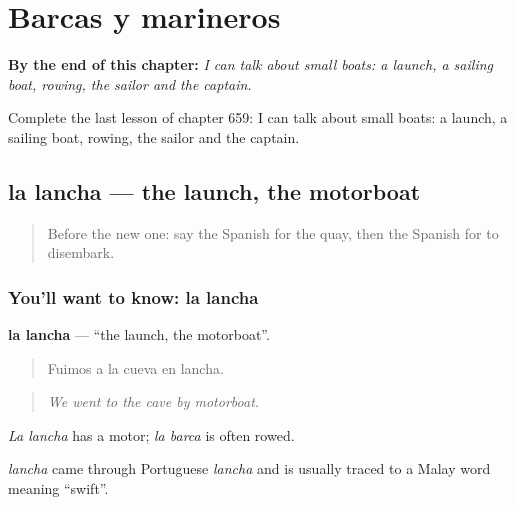 
\chapter{Barcas y marineros}
\label{ch:es-barcas-y-marineros}

\begin{chapteropening}
\textbf{By the end of this chapter:} \emph{I can talk about small boats: a launch, a sailing boat, rowing, the sailor and the captain.}

Complete the last lesson of chapter 659: I can talk about small boats: a launch, a sailing boat, rowing, the sailor and the captain.
\end{chapteropening}

\section[la lancha]{la lancha — the launch, the motorboat}

\label{lesson:ES-C659-lancha}



\begin{quote}
Before the new one: say the Spanish for the quay, then the Spanish for to disembark.
\end{quote}

\subsection*{You'll want to know: la lancha}
\textbf{la lancha} — \textquotedblleft{}the launch, the motorboat\textquotedblright{}.

\begin{quote}
Fuimos a la cueva en lancha.
\end{quote}

\begin{quote}
\emph{We went to the cave by motorboat.}
\end{quote}

\emph{La lancha} has a motor; \emph{la barca} is often rowed.

\begin{cousinweb}
\emph{lancha} came through Portuguese \emph{lancha} and is usually traced to a Malay word meaning \textquotedblleft{}swift\textquotedblright{}.
\end{cousinweb}

